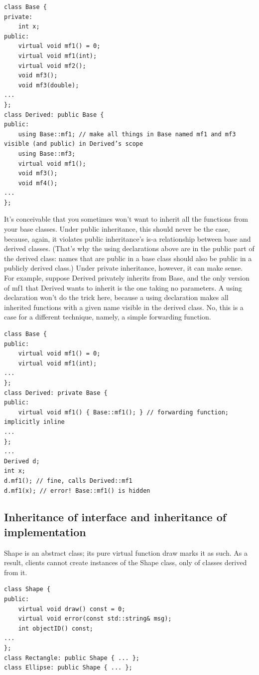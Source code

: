 \documentclass[a4paper,12pt,notitlepage]{article}
\begin{document}
\begin{verbatim}
class Base {
private:
    int x;
public:
    virtual void mf1() = 0;
    virtual void mf1(int);
    virtual void mf2();
    void mf3();
    void mf3(double);
...
};
class Derived: public Base {
public:
    using Base::mf1; // make all things in Base named mf1 and mf3 visible (and public) in Derived’s scope
    using Base::mf3;
    virtual void mf1();
    void mf3();
    void mf4();
...
};
\end{verbatim}

It's conceivable that you sometimes won't want to inherit all the functions from your base classes. Under public inheritance, this should never be the case, because, again, it violates public inheritance's is-a
relationship between base and derived classes. (That's why the using declarations above are in the public part of the derived class: names that are public in a base class should also be public in a publicly
derived class.) Under private inheritance, however, it can make sense. For example, suppose Derived privately inherits from Base, and the only version of mf1 that Derived wants to inherit is the one taking no parameters. A using declaration won't do the trick here, because a using declaration makes all inherited functions with a given name visible in the derived class. No, this is a case for a different technique, namely, a simple forwarding function.

\begin{verbatim}
class Base {
public:
    virtual void mf1() = 0;
    virtual void mf1(int);
...
};
class Derived: private Base {
public:
    virtual void mf1() { Base::mf1(); } // forwarding function; implicitly inline
...
};
...
Derived d;
int x;
d.mf1(); // fine, calls Derived::mf1
d.mf1(x); // error! Base::mf1() is hidden
\end{verbatim}


\subsection{Inheritance of interface and inheritance of implementation}

\noindent
Shape is an abstract class; its pure virtual function draw marks it as such. As a result, clients cannot create instances of the Shape class, only of classes derived from it.

\begin{verbatim}
class Shape {
public:
    virtual void draw() const = 0;
    virtual void error(const std::string& msg);
    int objectID() const;
...
};
class Rectangle: public Shape { ... };
class Ellipse: public Shape { ... };
\end{verbatim}
\end{document}
